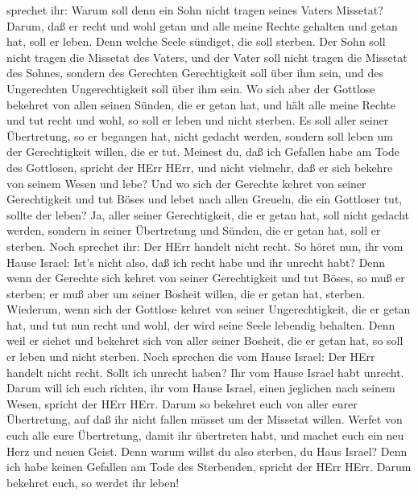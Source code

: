 sprechet ihr: Warum soll denn ein Sohn nicht tragen seines Vaters
Missetat? Darum, daß er recht und wohl getan und alle meine Rechte
gehalten und getan hat, soll er leben.  Denn welche Seele
sündiget, die soll sterben. Der Sohn soll nicht tragen die Missetat des
Vaters, und der Vater soll nicht tragen die Missetat des Sohnes, sondern
des Gerechten Gerechtigkeit soll über ihm sein, und des Ungerechten
Ungerechtigkeit soll über ihm sein.  Wo sich aber der
Gottlose bekehret von allen seinen Sünden, die er getan hat, und hält
alle meine Rechte und tut recht und wohl, so soll er leben und nicht
sterben.  Es soll aller seiner Übertretung, so er begangen
hat, nicht gedacht werden, sondern soll leben um der Gerechtigkeit
willen, die er tut.  Meinest du, daß ich Gefallen habe am
Tode des Gottlosen, spricht der HErr HErr, und nicht vielmehr, daß er
sich bekehre von seinem Wesen und lebe?  Und wo sich der
Gerechte kehret von seiner Gerechtigkeit und tut Böses und lebet nach
allen Greueln, die ein Gottloser tut, sollte der leben? Ja, aller seiner
Gerechtigkeit, die er getan hat, soll nicht gedacht werden, sondern in
seiner Übertretung und Sünden, die er getan hat, soll er sterben.
 Noch sprechet ihr: Der HErr handelt nicht recht. So höret
nun, ihr vom Hause Israel: Ist's nicht also, daß ich recht habe und ihr
unrecht habt?  Denn wenn der Gerechte sich kehret von
seiner Gerechtigkeit und tut Böses, so muß er sterben; er muß aber um
seiner Bosheit willen, die er getan hat, sterben. 
Wiederum, wenn sich der Gottlose kehret von seiner Ungerechtigkeit, die
er getan hat, und tut nun recht und wohl, der wird seine Seele lebendig
behalten.  Denn weil er siehet und bekehret sich von aller
seiner Bosheit, die er getan hat, so soll er leben und nicht sterben.
 Noch sprechen die vom Hause Israel: Der HErr handelt nicht
recht. Sollt ich unrecht haben? Ihr vom Hause Israel habt unrecht.
 Darum will ich euch richten, ihr vom Hause Israel, einen
jeglichen nach seinem Wesen, spricht der HErr HErr. Darum so bekehret
euch von aller eurer Übertretung, auf daß ihr nicht fallen müsset um der
Missetat willen.  Werfet von euch alle eure Übertretung,
damit ihr übertreten habt, und machet euch ein neu Herz und neuen Geist.
Denn warum willst du also sterben, du Haus Israel?  Denn
ich habe keinen Gefallen am Tode des Sterbenden, spricht der HErr HErr.
Darum bekehret euch, so werdet ihr leben!

